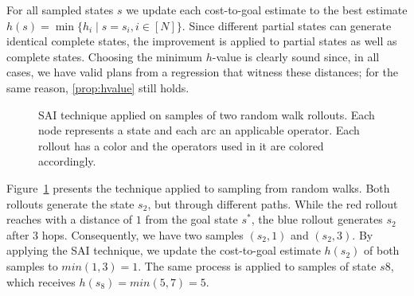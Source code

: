 For all sampled states $s$ we update each cost-to-goal estimate to the best estimate $h(s) = \min\{h_i \mid s=s_i, i\in[N]\}$. Since different partial states can generate identical complete states, the improvement is applied to partial states as well as complete states. Choosing the minimum $h$-value is clearly sound since, in all cases, we have valid plans from a regression that witness these distances; for the same reason, \cref{prop:hvalue} still holds.

\begin{figure}[ht]
    \caption[SAI technique applied on samples of random walk rollouts.]{SAI technique applied on samples of two random walk rollouts. Each node represents a state and each arc an applicable operator. Each rollout has a color and the operators used in it are colored accordingly.}
    \label{fig:sai}
    \addvspace{\baselineskip}
    \centering
\end{figure}

Figure~\ref{fig:sai} presents the technique applied to sampling from random walks. Both rollouts generate the state $s_2$, but through different paths. While the red rollout reaches with a distance of $1$ from the goal state $s^*$, the blue rollout generates $s_2$ after $3$ hops. Consequently, we have two samples $(s_2,1)$ and $(s_2,3)$. By applying the SAI technique, we update the cost-to-goal estimate $h(s_2)$ of both samples to $min(1,3)=1$. The same process is applied to samples of state $s8$, which receives $h(s_8)=min(5,7)=5$.

